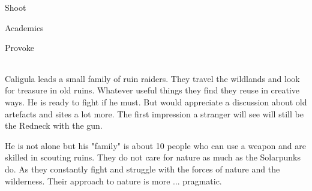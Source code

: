 \begin{npcBox}[title=Caligula]

    \begin{aspects}
    \item {}
    \item {}    
    \end{aspects}
    
    \begin{skills}
    \item {} Shoot
    \item {} Academics
    \item {} Provoke
    \end{skills}
    
    \begin{stunts}
    \item {}
    \end{stunts}
    
    \begin{stressSection}
    \end{stressSection}
    \begin{tabularx}{\textwidth}{ XX }
    \end{tabularx}
    
    \begin{consequences}
    \item {}
    \item {}
    \item {}
    \end{consequences}
    
    \begin{npcDescription}
    Caligula leads a small family of ruin raiders. They travel the wildlands and look for treasure in old ruins. Whatever useful things they find they reuse in creative ways.
    He is ready to fight if he must. But would appreciate a discussion about old artefacts and sites a lot more. The first impression a stranger will see will still be the Redneck with the gun.
    \end{npcDescription}
    
    \end{npcBox}

He is not alone but his "family" is about 10 people who can use a weapon and are skilled in scouting ruins. They do not care for nature as much as the Solarpunks do. As they constantly fight and struggle with the forces of nature and the wilderness. Their approach to nature is more ... pragmatic.

